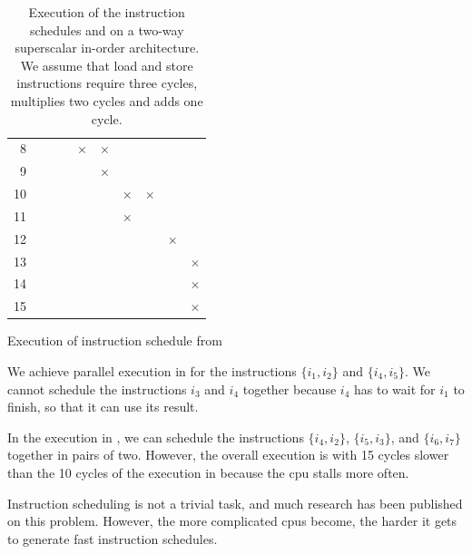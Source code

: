 \begin{table}
\begin{subtable}{0.48\textwidth}
\begin{tabular}{rccccccccc}
             8 &   &   &   &$\boldsymbol{\times}$&$\boldsymbol{\times}$&   &   &   &   \\
             9 &   &   &   &   &$\boldsymbol{\times}$&   &   &   &   \\ \rowcolor[gray]{.975}
            10 &   &   &   &   &   &$\boldsymbol{\times}$&$\boldsymbol{\times}$&   &   \\
            11 &   &   &   &   &   &$\boldsymbol{\times}$&   &   &   \\ \rowcolor[gray]{.975}
            12 &   &   &   &   &   &   &   &$\boldsymbol{\times}$&   \\
            13 &   &   &   &   &   &   &   &   &$\boldsymbol{\times}$\\ \rowcolor[gray]{.975}
            14 &   &   &   &   &   &   &   &   &$\boldsymbol{\times}$\\
            15 &   &   &   &   &   &   &   &   &$\boldsymbol{\times}$\\
            \bottomrule
        \end{tabular}
        \caption{Execution of instruction schedule from }
        \label{tbl:bg:schedule-comparison-b}
    \end{subtable}
    \caption[Schedule Comparison on a Two-Way Superscalar In-Order Architecture]{Execution of the instruction schedules  and  on a two-way superscalar in-order architecture. 
    We assume that load and store instructions require three cycles, multiplies two cycles and adds one cycle.}
    \label{tbl:bg:schedule-comparison}
\end{table}

We achieve parallel execution in  for the instructions $\{i_1, i_2\}$ and $\{i_4, i_5\}$.
We cannot schedule the instructions $i_3$ and $i_4$ together because $i_4$ has to wait for $i_1$ to finish, so that it can use its result.

In the execution in , we can schedule the instructions $\{i_4, i_2\}$, $\{i_5, i_3\}$, and $\{i_6, i_7\}$ together in pairs of two.
However, the overall execution is with 15 cycles slower than the 10 cycles of the execution in  because the \ac{cpu} stalls more often.

Instruction scheduling is not a trivial task, and much research has been published on this problem.
However, the more complicated \acp{cpu} become, the harder it gets to generate fast instruction schedules.

